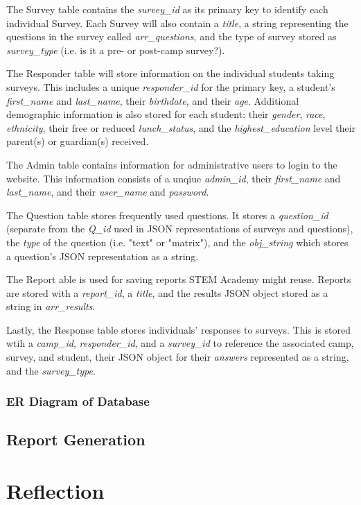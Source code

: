 \documentclass[letterpaper,10pt,serif,draftclsnofoot,onecolumn,compsoc,titlepage]{IEEEtran}
\begin{document}
The Survey table contains the \emph{survey\_id} as its primary key to identify each individual Survey.
Each Survey will also contain a \emph{title}, a string representing the questions in the survey called \emph{arr\_questions}, and the type of survey stored as \emph{survey\_type} (i.e. is it a pre- or post-camp survey?).

The Responder table will store information on the individual students taking surveys.
This includes a unique \emph{responder\_id} for the primary key, a student's \emph{first\_name} and \emph{last\_name}, their \emph{birthdate}, and their \emph{age}.
Additional demographic information is also stored for each student: their \emph{gender}, \emph{race}, \emph{ethnicity}, their free or reduced \emph{lunch\_status}, and the \emph{highest\_education} level their parent(s) or guardian(s) received.

The Admin table contains information for administrative users to login to the website.
This information consists of a unqiue \emph{admin\_id}, their \emph{first\_name} and \emph{last\_name}, and their \emph{user\_name} and \emph{password}.

The Question table stores frequently used questions.
It stores a \emph{question\_id} (separate from the \emph{Q\_id} used in JSON representations of surveys and questions), the \emph{type} of the question (i.e. "text" or "matrix"), and the \emph{obj\_string} which stores a question's JSON representation as a string.

The Report able is used for saving reports STEM Academy might reuse.
Reports are stored with a \emph{report\_id}, a \emph{title}, and the results JSON object stored as a string in \emph{arr\_results}.

Lastly, the Response table stores individuals' responses to surveys.
This is stored wtih a \emph{camp\_id}, \emph{responder\_id}, and a \emph{survey\_id} to reference the associated camp, survey, and student, their JSON object for their \emph{answers} represented as a string, and the \emph{survey\_type}.
\subsubsection{ER Diagram of Database}
\subsection{Report Generation}

\section{Reflection}
\end{document}

